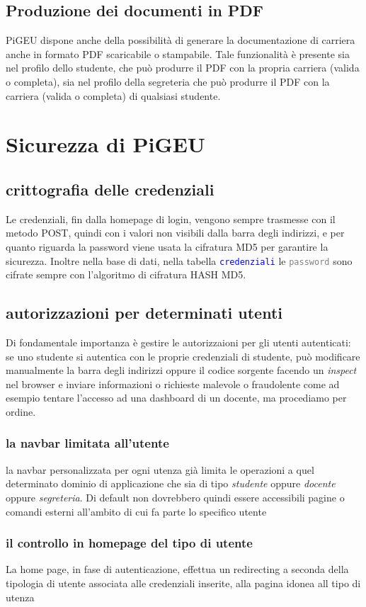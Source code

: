 \documentclass{article}
\newcommand{\tabb}[1]{\texttt{\textcolor{blue}{#1}}}
\newcommand{\attr}[1]{\texttt{\textcolor{gray}{#1}}}
\begin{document}
\subsection{Produzione dei documenti in PDF}
PiGEU dispone anche della possibilità di generare la documentazione di carriera anche in formato PDF scaricabile o stampabile. Tale funzionalità è presente sia nel profilo dello studente, che può produrre il PDF con la propria carriera (valida o completa), sia nel profilo della segreteria che può produrre il PDF con la carriera (valida o completa) di qualsiasi studente.


\section{Sicurezza di PiGEU}
\subsection{crittografia delle credenziali}
Le credenziali, fin dalla homepage di login, vengono sempre trasmesse con il metodo POST, quindi con i valori non visibili dalla barra degli indirizzi, e per quanto riguarda la password viene usata la cifratura MD5 per garantire la sicurezza.
Inoltre nella base di dati, nella tabella \tabb{credenziali} le \attr{password} sono cifrate sempre con l'algoritmo di cifratura HASH MD5.
\subsection{autorizzazioni per determinati utenti}
Di fondamentale importanza è gestire le autorizzaioni per gli utenti autenticati: se uno studente si autentica con le proprie credenziali di studente, può modificare manualmente la barra degli indirizzi oppure il codice sorgente facendo un \textit{inspect} nel browser e inviare informazioni o richieste malevole o fraudolente come ad esempio tentare l'accesso ad una dashboard di un docente, ma procediamo per ordine.
\subsubsection{la navbar limitata all'utente}
la navbar personalizzata per ogni utenza già limita le operazioni a quel determinato dominio di applicazione che sia di tipo \textit{studente} oppure \textit{docente} oppure \textit{segreteria}. Di default non dovrebbero quindi essere accessibili pagine o comandi esterni all'ambito di cui fa parte lo specifico utente
\subsubsection{il controllo in homepage del tipo di utente}
La home page, in fase di autenticazione, effettua un redirecting a seconda della tipologia di utente associata alle credenziali inserite, alla pagina idonea all tipo di utenza
\end{document}
